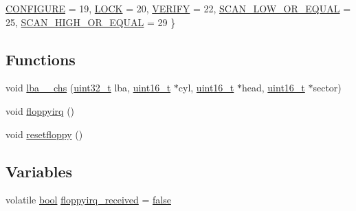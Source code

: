 \begin{DoxyCompactItemize}
\hyperlink{a00020_a9990a5de334fdaec2ce93b74b8676148_a9990a5de334fdaec2ce93b74b8676148a5183723f609e1521f38450e9792af61d}{C\+O\+N\+F\+I\+G\+U\+RE} = 19, 
\hyperlink{a00020_a9990a5de334fdaec2ce93b74b8676148_a9990a5de334fdaec2ce93b74b8676148a438b68412f24003b09e0993b62dc7b48}{L\+O\+CK} = 20, 
\hyperlink{a00020_a9990a5de334fdaec2ce93b74b8676148_a9990a5de334fdaec2ce93b74b8676148a570b000ad5bd233482644aaaac095680}{V\+E\+R\+I\+FY} = 22, 
\hyperlink{a00020_a9990a5de334fdaec2ce93b74b8676148_a9990a5de334fdaec2ce93b74b8676148a7eefaec5fabe1db94fd12a84af66b6cd}{S\+C\+A\+N\+\_\+\+L\+O\+W\+\_\+\+O\+R\+\_\+\+E\+Q\+U\+AL} = 25, 
\newline
\hyperlink{a00020_a9990a5de334fdaec2ce93b74b8676148_a9990a5de334fdaec2ce93b74b8676148a1ee024a89ac2dbd7845f63306f175546}{S\+C\+A\+N\+\_\+\+H\+I\+G\+H\+\_\+\+O\+R\+\_\+\+E\+Q\+U\+AL} = 29
 \}
\end{DoxyCompactItemize}
\subsection*{Functions}
\begin{DoxyCompactItemize}
\item 
void \hyperlink{a00020_a782ff57a4ec7786197ec3a12d4f52332_a782ff57a4ec7786197ec3a12d4f52332}{lba\+\_\+\_\+chs} (\hyperlink{a00104_a435d1572bf3f880d55459d9805097f62_a435d1572bf3f880d55459d9805097f62}{uint32\+\_\+t} lba, \hyperlink{a00104_a273cf69d639a59973b6019625df33e30_a273cf69d639a59973b6019625df33e30}{uint16\+\_\+t} $\ast$cyl, \hyperlink{a00104_a273cf69d639a59973b6019625df33e30_a273cf69d639a59973b6019625df33e30}{uint16\+\_\+t} $\ast$head, \hyperlink{a00104_a273cf69d639a59973b6019625df33e30_a273cf69d639a59973b6019625df33e30}{uint16\+\_\+t} $\ast$sector)
\item 
void \hyperlink{a00020_acbe17688655526c3fa02f324ae8336ca_acbe17688655526c3fa02f324ae8336ca}{floppyirq} ()
\item 
void \hyperlink{a00020_ad64d38a767bc5f30a3e13a5b01b9cf35_ad64d38a767bc5f30a3e13a5b01b9cf35}{resetfloppy} ()
\end{DoxyCompactItemize}
\subsection*{Variables}
\begin{DoxyCompactItemize}
\item 
volatile \hyperlink{a00104_af6a258d8f3ee5206d682d799316314b1_af6a258d8f3ee5206d682d799316314b1}{bool} \hyperlink{a00020_a2cfa75d25a7da8cb54551c7840e80d40_a2cfa75d25a7da8cb54551c7840e80d40}{floppyirq\+\_\+received} = \hyperlink{a00104_af6a258d8f3ee5206d682d799316314b1_af6a258d8f3ee5206d682d799316314b1ae9de385ef6fe9bf3360d1038396b884c}{false}
\end{DoxyCompactItemize}


